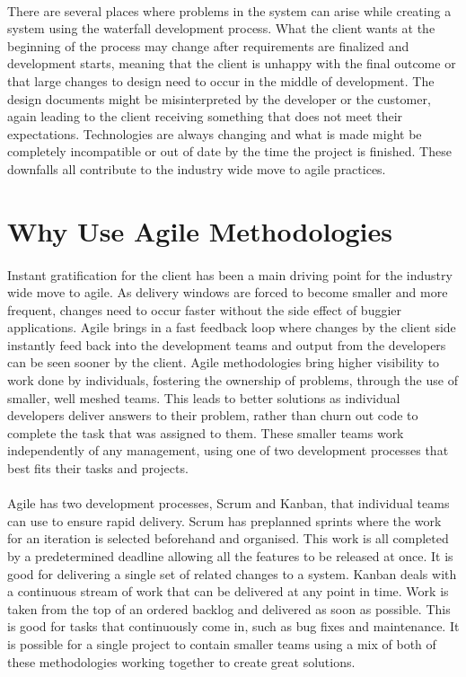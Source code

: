 \documentclass[11pt,twocolumn]{article}
\begin{document}
\paragraph{}
There are several places where problems in the system can arise while creating a system using the waterfall development process.
What the client wants at the beginning of the process may change after requirements are finalized and development starts, meaning that the client is unhappy with the final outcome or that large changes to design need to occur in the middle of development.
The design documents might be misinterpreted by the developer or the customer, again leading to the client receiving something that does not meet their expectations.
Technologies are always changing and what is made might be completely incompatible or out of date by the time the project is finished.
These downfalls all contribute to the industry wide move to agile practices.

\section{Why Use Agile Methodologies}
\paragraph{}
Instant gratification for the client has been a main driving point for the industry wide move to agile.
As delivery windows are forced to become smaller and more frequent, changes need to occur faster without the side effect of buggier applications.
Agile brings in a fast feedback loop where changes by the client side instantly feed back into the development teams and output from the developers can be seen sooner by the client.
Agile methodologies bring higher visibility to work done by individuals, fostering the ownership of problems, through the use of smaller, well meshed teams.
This leads to better solutions as individual developers deliver answers to their problem, rather than churn out code to complete the task that was assigned to them.
These smaller teams work independently of any management, using one of two development processes that best fits their tasks and projects.
\paragraph{}
Agile has two development processes, Scrum and Kanban, that individual teams can use to ensure rapid delivery.
Scrum has preplanned sprints where the work for an iteration is selected beforehand and organised.
This work is all completed by a predetermined deadline allowing all the features to be released at once.
It is good for delivering a single set of related changes to a system.
Kanban deals with a continuous stream of work that can be delivered at any point in time.
Work is taken from the top of an ordered backlog and delivered as soon as possible.
This is good for tasks that continuously come in, such as bug fixes and maintenance.
It is possible for a single project to contain smaller teams using a mix of both of these methodologies working together to create great solutions.
\end{document}
